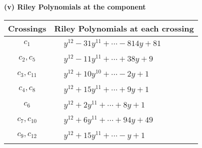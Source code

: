 \documentclass[1p]{elsarticle_modified}
\theoremstyle{definition}
\begin{document}
\newpage\renewcommand{\arraystretch}{1}
\flushleft \textbf{(v) Riley Polynomials at the component}\newline \\
\begin{tabular}{m{50pt}|m{274pt}}
Crossings & \hspace{64pt}Riley Polynomials at each crossing \\
\hline $$\begin{aligned}c_{1}\end{aligned}$$&$\begin{aligned}
&y^{12}-31 y^{11}+\cdots-814 y+81
\end{aligned}$\\
\hline $$\begin{aligned}c_{2},c_{5}\end{aligned}$$&$\begin{aligned}
&y^{12}-11 y^{11}+\cdots+38 y+9
\end{aligned}$\\
\hline $$\begin{aligned}c_{3},c_{11}\end{aligned}$$&$\begin{aligned}
&y^{12}+10 y^{10}+\cdots-2 y+1
\end{aligned}$\\
\hline $$\begin{aligned}c_{4},c_{8}\end{aligned}$$&$\begin{aligned}
&y^{12}+15 y^{11}+\cdots+9 y+1
\end{aligned}$\\
\hline $$\begin{aligned}c_{6}\end{aligned}$$&$\begin{aligned}
&y^{12}+2 y^{11}+\cdots+8 y+1
\end{aligned}$\\
\hline $$\begin{aligned}c_{7},c_{10}\end{aligned}$$&$\begin{aligned}
&y^{12}+6 y^{11}+\cdots+94 y+49
\end{aligned}$\\
\hline $$\begin{aligned}c_{9},c_{12}\end{aligned}$$&$\begin{aligned}
&y^{12}+15 y^{11}+\cdots- y+1
\end{aligned}$\\
\hline
\end{tabular}\\~\\
\end{document}
